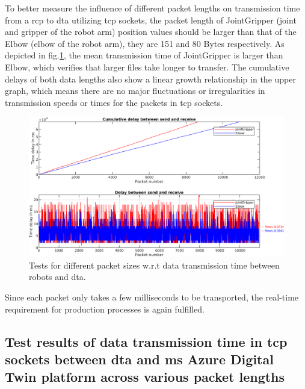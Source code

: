 To better measure the influence of different packet lengths on transmission time from 
a \gls{rcp} to \gls{dta} utilizing \gls{tcp} sockets, the packet length of JointGripper 
(joint and gripper of the robot arm) position values should be larger than that of the 
Elbow (elbow of the robot arm), they are 151 and 80 Bytes respectively. As depicted in 
fig.\ref{fig: SR-JointGripper-Elbow}, the mean transmission time of JointGripper is 
larger than Elbow, which verifies that larger files take longer to transfer. 
The cumulative delays of both data lengths also show a linear growth relationship in 
the upper graph, which means there are no major fluctuations or irregularities in 
transmission speeds or times for the packets in \gls{tcp} sockets. 


\begin{figure}[htb]
    \includegraphics[width=\textwidth]{figures/tests/DT/Delay_SendReceive_JointGripper_Elbow.png}
    \centering
    \caption{Tests for different packet sizes w.r.t data transmission time between robots 
    and \gls{dta}. \label{fig: SR-JointGripper-Elbow}}
\end{figure}

Since each packet only takes a few milliseconds to be transported, the real-time 
requirement for production processes is again fulfilled. 



\subsection{Test results of data transmission time in \gls{tcp} sockets between \gls{dta} 
and \gls{ms} Azure Digital Twin platform across various packet lengths} \label{chap: Result-DTA-DT}

